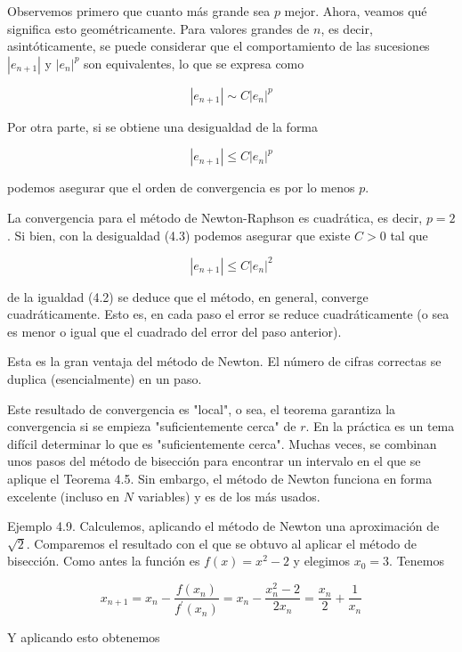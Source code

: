\documentclass[10pt]{article}
\begin{document}
Observemos primero que cuanto más grande sea $p$ mejor. Ahora, veamos qué significa esto geométricamente. Para valores grandes de $n$, es decir, asintóticamente, se puede considerar que el comportamiento de las sucesiones $\left|e_{n+1}\right|$ y $\left|e_{n}\right|^{p}$ son equivalentes, lo que se expresa como

$$
\left|e_{n+1}\right| \sim C\left|e_{n}\right|^{p}
$$

Por otra parte, si se obtiene una desigualdad de la forma

$$
\left|e_{n+1}\right| \leq C\left|e_{n}\right|^{p}
$$

podemos asegurar que el orden de convergencia es por lo menos $p$.

La convergencia para el método de Newton-Raphson es cuadrática, es decir, $p=2$. Si bien, con la desigualdad (4.3) podemos asegurar que existe $C>0$ tal que

$$
\left|e_{n+1}\right| \leq C\left|e_{n}\right|^{2}
$$

de la igualdad (4.2) se deduce que el método, en general, converge cuadráticamente. Esto es, en cada paso el error se reduce cuadráticamente (o sea es menor o igual que el cuadrado del error del paso anterior).

Esta es la gran ventaja del método de Newton. El número de cifras correctas se duplica (esencialmente) en un paso.

Este resultado de convergencia es "local", o sea, el teorema garantiza la convergencia si se empieza "suficientemente cerca" de $r$. En la práctica es un tema difícil determinar lo que es "suficientemente cerca". Muchas veces, se combinan unos pasos del método de bisección para encontrar un intervalo en el que se aplique el Teorema 4.5. Sin embargo, el método de Newton funciona en forma excelente (incluso en $N$ variables) y es de los más usados.

Ejemplo 4.9. Calculemos, aplicando el método de Newton una aproximación de $\sqrt{2}$. Comparemos el resultado con el que se obtuvo al aplicar el método de bisección. Como antes la función es $f(x)=x^{2}-2$ y elegimos $x_{0}=3$. Tenemos


\begin{equation*}
x_{n+1}=x_{n}-\frac{f\left(x_{n}\right)}{f^{\prime}\left(x_{n}\right)}=x_{n}-\frac{x_{n}^{2}-2}{2 x_{n}}=\frac{x_{n}}{2}+\frac{1}{x_{n}} \tag{4.4}
\end{equation*}


Y aplicando esto obtenemos
\end{document}

